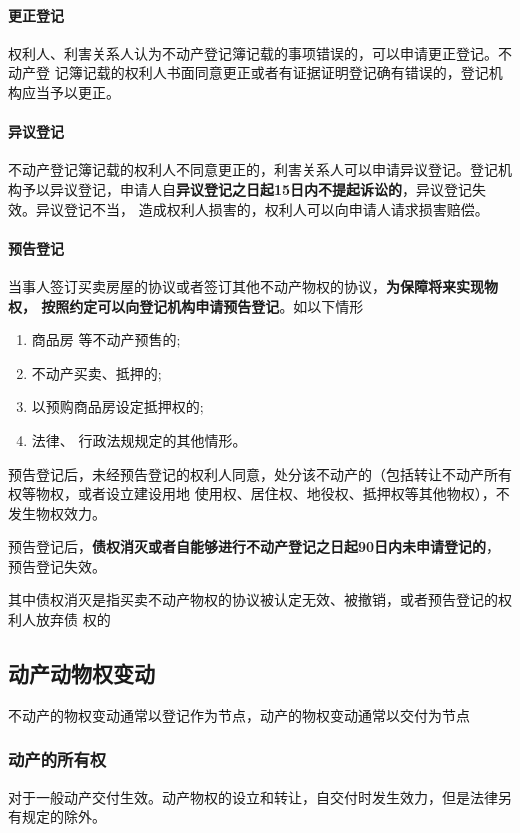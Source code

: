 \documentclass[UTF8,12pt]{ctexart}
\numberwithin{equation}{section} %
\numberwithin{figure}{section}
\numberwithin{table}{section}
\begin{document}
	
	\paragraph{更正登记} 权利人、利害关系人认为不动产登记簿记载的事项错误的，可以申请更正登记。不动产登 记簿记载的权利人书面同意更正或者有证据证明登记确有错误的，登记机构应当予以更正。
	
	\paragraph{异议登记}
	不动产登记簿记载的权利人不同意更正的，利害关系人可以申请异议登记。登记机构予以异议登记，申请人自\textbf{异议登记之日起15日内不提起诉讼的}，异议登记失效。异议登记不当， 造成权利人损害的，权利人可以向申请人请求损害赔偿。
	
	\paragraph{预告登记}
	当事人签订买卖房屋的协议或者签订其他不动产物权的协议，\textbf{为保障将来实现物权， 按照约定可以向登记机构申请预告登记}。如以下情形
	\begin{enumerate}
		\item 商品房 等不动产预售的;
		
		\item 不动产买卖、抵押的;
		
		\item 以预购商品房设定抵押权的;
		
		\item 法律、 行政法规规定的其他情形。
	\end{enumerate}
	
	预告登记后，未经预告登记的权利人同意，处分该不动产的（包括转让不动产所有权等物权，或者设立建设用地 使用权、居住权、地役权、抵押权等其他物权），不发生物权效力。
	
	预告登记后，\textbf{债权消灭或者自能够进行不动产登记之日起90日内未申请登记的}，预告登记失效。
	
	其中债权消灭是指买卖不动产物权的协议被认定无效、被撤销，或者预告登记的权利人放弃债 权的
	
	\subsection{动产动物权变动}
	不动产的物权变动通常以登记作为节点，动产的物权变动通常以交付为节点
	
	\subsubsection{动产的所有权}
	对于一般动产交付生效。动产物权的设立和转让，自交付时发生效力，但是法律另有规定的除外。
	
\end{document}
